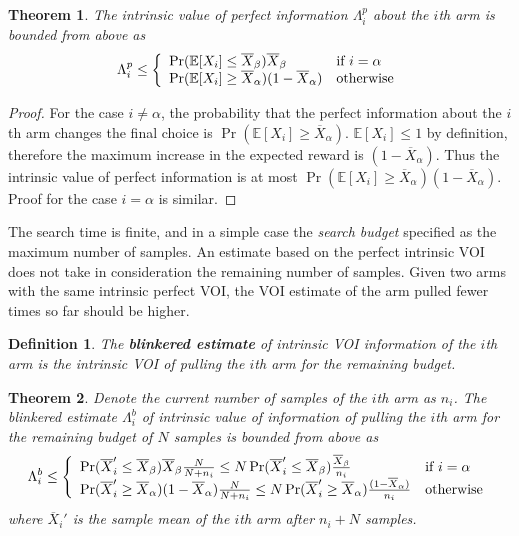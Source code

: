 \documentclass{article}
\newcommand {\IE} {\ensuremath {\mathbb{E}}}
\newtheorem{dfn}{Definition}
\newtheorem{thm}{Theorem}
\begin{document}
\begin{thm} The intrinsic value of perfect information $\Lambda_i^p$ about the $i$th arm is
  bounded from above as
\begin{equation}
  \Lambda_i^p \le \left\{
  \begin{array}{l l}
    \Pr(\IE[X_i] \le \overline X_\beta)\overline X_\beta & \mbox{if $i=\alpha$} \\
    \Pr(\IE[X_i] \ge \overline X_\alpha)(1-\overline X_\alpha) & \mbox{otherwise}
  \end{array} \right.
\label{eqn:thm-vopi}
\end{equation}
\label{thm:vopi}
\end{thm}

\begin{proof} For the case $i\ne \alpha$, the probability that the perfect
  information about the $i$th arm changes the final choice is
  $\Pr(\IE[X_i] \ge \overline X_\alpha)$. $\IE[X_i] \le 1$ by definition,
  therefore the maximum increase in the expected reward is
  $(1-\overline X_\alpha)$. Thus the intrinsic value of perfect
  information is at most $\Pr(\IE[X_i] \ge \overline
  X_\alpha)(1-\overline X_\alpha)$.
  Proof for the case $i=\alpha$ is similar.
\end{proof}

The search time is finite, and in a simple case the \textit{search
  budget} specified as the maximum number of samples.
An estimate based on the perfect intrinsic VOI does not take in
consideration the remaining number of samples. Given two arms
with the same intrinsic perfect VOI, the VOI
estimate of the arm pulled fewer times so far should be higher.

\begin{dfn} The \textbf{blinkered estimate} of intrinsic VOI information of the
  $i$th arm is the intrinsic VOI of pulling the $i$th arm for the
  remaining budget.
\end{dfn}

\begin{thm} Denote the current number of samples of the $i$th arm as
  $n_i$. The blinkered estimate $\Lambda_i^b$ of intrinsic value of
  information of pulling the $i$th arm for the remaining budget of $N$
  samples is bounded from above as
\begin{equation}
  \Lambda_i^b \le \left\{
  \begin{array}{l l}
    \Pr(\overline X_i'\le\overline X_\beta)\overline X_\beta\frac N {N+n_i}
       \le N\Pr(\overline X_i'\le\overline X_\beta)\frac {\overline X_\beta} {n_i} & \mbox{if $i=\alpha$} \\
    \Pr(\overline X_i'\ge\overline X_\alpha)(1-\overline  X_\alpha)\frac N {N+n_i}
       \le N\Pr(\overline X_i'\ge\overline X_\alpha)\frac {(1-\overline  X_\alpha)} {n_i} & \mbox{otherwise}
  \end{array} \right.
\label{eqn:thm-be}
\end{equation}
where $\overline X_i'$ is the sample mean of the $i$th arm after $n_i+N$ 
samples.
\label{thm:be}
\end{thm}
\end{document}
